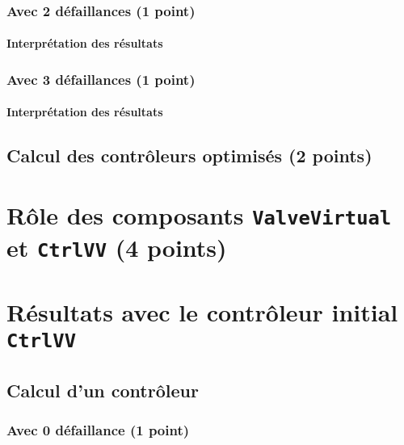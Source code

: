 \documentclass[a4paper]{book}
\begin{document}
\subsubsection{Avec 2 défaillances (1 point)}





\paragraph{Interprétation des résultats}

\subsubsection{Avec 3 défaillances (1 point)}





\paragraph{Interprétation des résultats}

\subsection{Calcul des contrôleurs optimisés (2 points)}

\section{Rôle des composants {\tt ValveVirtual} et {\tt CtrlVV} (4 points)}

\section{Résultats avec le contrôleur initial {\tt CtrlVV}}

\subsection{Calcul d'un contrôleur}

\subsubsection{Avec 0 défaillance (1 point)}





\end{document}
